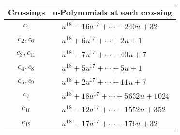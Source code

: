 \documentclass[1p]{elsarticle_modified}
\theoremstyle{definition}
\begin{document}
\begin{tabular}{m{50pt}|m{274pt}}
Crossings & \hspace{64pt}u-Polynomials at each crossing \\
\hline $$\begin{aligned}c_{1}\end{aligned}$$&$\begin{aligned}
&u^{18}-16 u^{17}+\cdots-240 u+32
\end{aligned}$\\
\hline $$\begin{aligned}c_{2},c_{6}\end{aligned}$$&$\begin{aligned}
&u^{18}+6 u^{17}+\cdots+2 u+1
\end{aligned}$\\
\hline $$\begin{aligned}c_{3},c_{11}\end{aligned}$$&$\begin{aligned}
&u^{18}-7 u^{17}+\cdots-40 u+7
\end{aligned}$\\
\hline $$\begin{aligned}c_{4},c_{8}\end{aligned}$$&$\begin{aligned}
&u^{18}+5 u^{17}+\cdots+5 u+1
\end{aligned}$\\
\hline $$\begin{aligned}c_{5},c_{9}\end{aligned}$$&$\begin{aligned}
&u^{18}+2 u^{17}+\cdots+11 u+7
\end{aligned}$\\
\hline $$\begin{aligned}c_{7}\end{aligned}$$&$\begin{aligned}
&u^{18}+18 u^{17}+\cdots+5632 u+1024
\end{aligned}$\\
\hline $$\begin{aligned}c_{10}\end{aligned}$$&$\begin{aligned}
&u^{18}-12 u^{17}+\cdots-1552 u+352
\end{aligned}$\\
\hline $$\begin{aligned}c_{12}\end{aligned}$$&$\begin{aligned}
&u^{18}-17 u^{17}+\cdots-176 u+32
\end{aligned}$\\
\hline
\end{tabular}\\~\\
\end{document}
